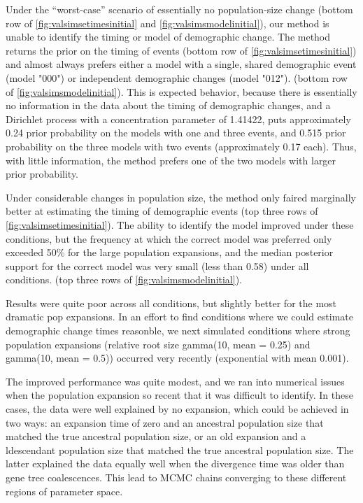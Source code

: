 Under the ``worst-case'' scenario of essentially no population-size change
(bottom row of \figs \ref{fig:valsimsetimesinitial} and
\ref{fig:valsimsmodelinitial}), our method is unable to identify the timing or
model of demographic change.
The method returns the prior on the timing of events 
(bottom row of \figs \ref{fig:valsimsetimesinitial})
and almost always prefers either a model with a single, shared demographic
event (model "000") or independent demographic changes (model "012").
(bottom row of \figs \ref{fig:valsimsmodelinitial}).
This is expected behavior, because there is essentially no information in the
data about the timing of demographic changes, and a Dirichlet process with a
concentration parameter of 1.41422, puts approximately 0.24 prior probability
on the models with one and three events, and 0.515 prior probability on the
three models with two events (approximately 0.17 each).
Thus, with little information, the method prefers one of the two models with
larger prior probability.

Under considerable changes in population size, the method only faired
marginally better at estimating the timing of demographic events
(top three rows of \figs \ref{fig:valsimsetimesinitial}).
The ability to identify the model improved under these
conditions, but the frequency at which the correct model
was preferred only exceeded 50\% for the large population
expansions, and the median posterior support for the correct
model was very small (less than 0.58) under all conditions.
(top three rows of \figs \ref{fig:valsimsmodelinitial}).

Results were quite poor across all conditions, but slightly better for the most dramatic pop expansions.
In an effort to find conditions where we could estimate demographic change times reasonble, we next simulated conditions where strong population expansions (relative root size gamma(10, mean = 0.25) and gamma(10, mean = 0.5)) occurred very recently (exponential with mean 0.001).

The improved performance was quite modest, and we ran into numerical issues when the
population expansion so recent that it was difficult to identify.
In these cases, the data were well explained by no expansion, which could be achieved in two ways: an expansion time of zero and an ancestral population size that matched the true ancestral population size, or an old expansion and a ldescendant population size that matched the true ancestral population size. The latter explained the data equally well when the divergence time was older than gene tree coalescences. This lead to MCMC chains converging to these different regions of parameter space.

